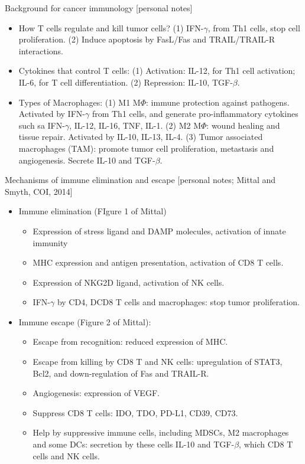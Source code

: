 \documentclass{report}
\begin{document}
Background for cancer immunology [personal notes]
\begin{itemize}
	\item How T cells regulate and kill tumor cells? (1) IFN-$\gamma$, from Th1 cells, stop cell proliferation. (2) Induce apoptosis by FasL/Fas and TRAIL/TRAIL-R interactions. 
	
	\item Cytokines that control T cells: (1) Activation: IL-12, for Th1 cell activation; IL-6, for T cell differentiation. (2) Repression: IL-10, TGF-$\beta$. 
	
	\item Types of Macrophages: (1) M1 M$\Phi$: immune protection against pathogens. Activated by IFN-$\gamma$ from Th1 cells, and generate pro-inflammatory cytokines such sa IFN-$\gamma$, IL-12, IL-16, TNF, IL-1. (2) M2 M$\Phi$: wound healing and tissue repair. Activated by IL-10, IL-13, IL-4. (3) Tumor associated macrophages (TAM): promote tumor cell proliferation, metastasis and angiogenesis. Secrete IL-10 and TGF-$\beta$. 
\end{itemize}

Mechanisms of immune elimination and escape [personal notes; Mittal and Smyth, COI, 2014]
\begin{itemize}
	\item Immune elimination (FIgure 1 of Mittal)
	\begin{itemize}
		\item Expression of stress ligand and DAMP molecules, activation of innate immunity
		\item MHC expression and antigen presentation, activation of CD8 T cells.
		\item Expression of NKG2D ligand, activation of NK cells. 
		\item IFN-$\gamma$ by CD4, DCD8 T cells and macrophages: stop tumor proliferation. 
	\end{itemize}
	
	\item Immune escape (Figure 2 of Mittal): 
	\begin{itemize}
		\item Escape from recognition: reduced expression of MHC. 
		\item Escape from killing by CD8 T and NK cells: upregulation of STAT3, Bcl2, and down-regulation of Fas and TRAIL-R. 
		\item Angiogenesis: expression of VEGF. 
		\item Suppress CD8 T cells: IDO, TDO, PD-L1, CD39, CD73. 
		\item Help by suppressive immune cells, including MDSCs, M2 macrophages and some DCs: secretion by these cells IL-10 and TGF-$\beta$, which CD8 T cells and NK cells. 
	\end{itemize}
\end{itemize}
\end{document}
